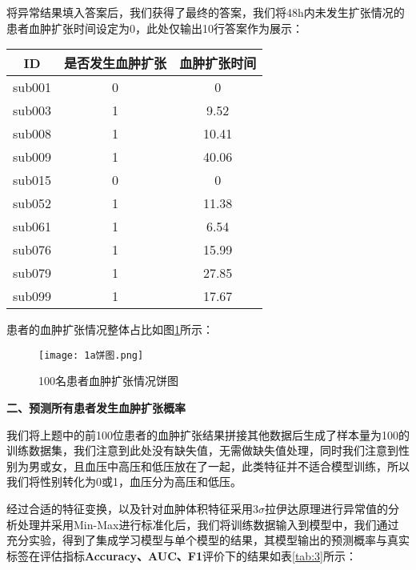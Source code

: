 \documentclass[bwprint]{gmcmthesis}
\begin{document}
				将异常结果填入答案后，我们获得了最终的答案，我们将48h内未发生扩张情况的患者血肿扩张时间设定为0，此处仅输出10行答案作为展示：
				
				\begin{table}[H]
					\centering
					\setlength{\tabcolsep}{13mm}
					\begin{tabular}{|c|c|c|}
						\hline
						\rowcolor{blue!25} ID & 是否发生血肿扩张 & 血肿扩张时间 \\ \hline
						\rowcolor{blue!5}sub001 & 0 & 0\\ \hline
						\rowcolor{white!5}sub003 & 1 & 9.52\\ \hline
						\rowcolor{blue!5}sub008 & 1 & 10.41\\ \hline
						\rowcolor{white!5}sub009 & 1  & 40.06 \\ \hline
						\rowcolor{blue!5}sub015 & 0  & 0  \\ \hline
						\rowcolor{white!5}sub052 & 1  & 11.38 \\ \hline
						\rowcolor{blue!5}sub061 & 1  & 6.54 \\ \hline
						\rowcolor{white!5}sub076 & 1  & 15.99 \\ \hline
						\rowcolor{blue!5}sub079 & 1  & 27.85 \\ \hline
						\rowcolor{white!5}sub099 & 1  & 17.67 \\ \hline
					\end{tabular}
				\end{table}
				
				患者的血肿扩张情况整体占比如图\ref{fig:6}所示：
				
				\begin{figure}[H]
					\centering
					\texttt{[image: 1a饼图.png]}
					\caption{100名患者血肿扩张情况饼图}
					\label{fig:6}
				\end{figure}
				
				
				\textbf{二、预测所有患者发生血肿扩张概率}
				
				我们将上题中的前100位患者的血肿扩张结果拼接其他数据后生成了样本量为100的训练数据集，我们注意到此处没有缺失值，无需做缺失值处理，同时我们注意到性别为男或女，且血压中高压和低压放在了一起，此类特征并不适合模型训练，所以我们将性别转化为0或1，血压分为高压和低压。
				
				经过合适的特征变换，以及针对血肿体积特征采用3$\sigma$拉伊达原理进行异常值的分析处理并采用Min-Max进行标准化后，我们将训练数据输入到模型中，我们通过充分实验，得到了集成学习模型与单个模型的结果，其模型输出的预测概率与真实标签在评估指标\textbf{Accuracy、AUC、F1}评价下的结果如表\ref{tab:3}所示：
				
\end{document}
